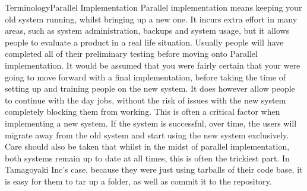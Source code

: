 \begin{callout}{Terminology}{Parallel Implementation}
Parallel implementation means keeping your old system running, whilst bringing up a new one.
It incurs extra effort in many areas, such as system administration, backups and system usage, but it allows people to evaluate a product in a real life situation.
Usually people will have completed all of their preliminary testing before moving onto Parallel implementation.
It would be assumed that you were fairly certain that your were going to move forward with a final implementation, before taking the time of setting up and training people on the new system.
\newline
\newline
It does however allow people to continue with the day jobs, without the risk of issues with the new system completely blocking them from working.
This is often a critical factor when implementing a new system.
If the system is successful, over time, the users will migrate away from the old system and start using the new system exclusively.
Care should also be taken that whilst in the midst of parallel implementation, both systems remain up to date at all times, this is often the trickiest part.
In Tamagoyaki Inc's case, because they were just using tarballs of their code base, it is easy for them to tar up a folder, as well as commit it to the repository.
\end{callout}

